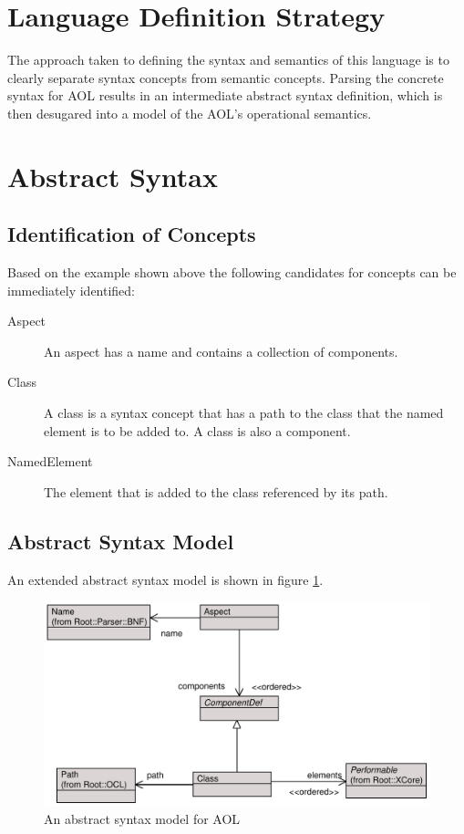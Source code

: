 \section{Language Definition Strategy}

The approach taken to defining the syntax and semantics of this
language is to clearly separate syntax concepts from semantic
concepts. Parsing the concrete syntax for AOL results in an
intermediate abstract syntax definition, which is then desugared
into a model of the AOL's operational semantics.

\section{Abstract Syntax}

\subsection{Identification of Concepts}

Based on the example shown above the following candidates for
concepts can be immediately identified:

\begin{description}
\item [Aspect]  An aspect has a name and contains a collection of
components.

\item [Class] A class is a syntax concept that has a path to the
class that the named element is to be added to. A class is also a
component.

\item [NamedElement] The element that is added to the class
referenced by its path.
\end{description}

\subsection{Abstract Syntax Model}

An extended abstract syntax model is shown in figure
\ref{aspectabs2}.

\begin{figure}[htb]
\begin{center}
\includegraphics[width=14cm]{CaseStudy1/figures/abs2.pdf}
\caption{An abstract syntax model for AOL} \label{aspectabs2}
\end{center}
\end{figure}

